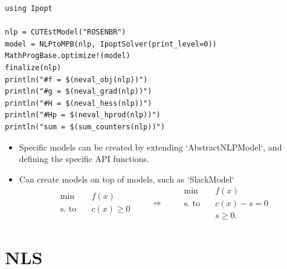 \begin{frame}[fragile,t]


\begin{lstlisting}
using Ipopt

nlp = CUTEstModel("ROSENBR")
model = NLPtoMPB(nlp, IpoptSolver(print_level=0))
MathProgBase.optimize!(model)
finalize(nlp)
println("#f = $(neval_obj(nlp))")
println("#g = $(neval_grad(nlp))")
println("#H = $(neval_hess(nlp))")
println("#Hp = $(neval_hprod(nlp))")
println("sum = $(sum_counters(nlp))")
\end{lstlisting}
\end{frame}

\begin{frame}[fragile,t]
  \begin{itemize}
    \item Specific models can be created by extending `AbstractNLPModel`, and defining the
      specific API functions.
    \item Can create models on top of models, such as `SlackModel`
      $$ \begin{array}{rl}
        \min & \quad f(x) \\
        \mbox{s. to} & \quad c(x) \geq 0
      \end{array} \qquad \Rightarrow
      \qquad
      \begin{array}{rl}
        \min & \quad f(x) \\
        \mbox{s. to} & \quad c(x) - s = 0 \\
                     & \quad s \geq 0.
      \end{array}
      $$
  \end{itemize}
\end{frame}

\section{NLS}


